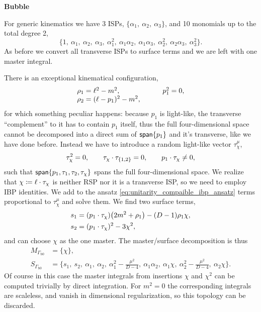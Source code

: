 \textbf{Bubble}

For generic kinematics we have 3 ISPs, $\{\alpha_1,~\alpha_2,~\alpha_3\}$, and
10 monomials up to the total degree 2,
\[
  \{1,~\alpha_1,~\alpha_2,~\alpha_3,~\alpha_1^2,~\alpha_1\alpha_2,~\alpha_1\alpha_3,~\alpha_2^2,~\alpha_2\alpha_3,~ \alpha_3^2\}.
\]
As before we convert all transverse ISPs to surface terms and we are left with one master integral.

There is an exceptional kinematical configuration,
\begin{equation*}
  \begin{tabular}{ll}
    $\rho_1 = \ell^2-m^2$,               &  \qquad $p_1^2=0$,\\
    $\rho_2 = (\ell-p_1)^2-m^2$,         &  \\
  \end{tabular}
\end{equation*}
for which something peculiar happens:
because $p_1$ is light-like, the transverse ``complement'' to it has to contain $p_1$ itself, thus the full four-dimensional space
cannot be decomposed into a direct sum of $\mathsf{span}\{p_1\}$ and it's transverse, like we have done before.
Instead we have to introduce a random light-like vector $\tau_\chi^\mu$,
\[
  \tau_\chi^2=0, \qquad \sp(\tau_\chi,\tau_{\{1,2\}}) = 0, \qquad  \sp(p_1,\tau_\chi) \neq 0,
\]
such that $\mathsf{span}\{p_1,\tau_1,\tau_2,\tau_\chi\}$ spans the full four-dimensional space.
We realize that $\chi \coloneqq \sp(\ell,\tau_\chi)$ is neither RSP nor it is a transverse ISP, so 
we need to employ IBP identities.
We add to the ansatz \eqref{eq:unitarity_compaible_ibp_ansatz} terms proportional to $\tau_\chi^\mu$ and solve them.
We find two surface terms,
\begin{align*}
  s_1 &= (\sp(p_1,\tau_\chi)) \qty(2 m^2 + \rho_1) - (D-1)\rho_1\chi, \\
  s_2 &= (\sp(p_1,\tau_\chi))^2 - 3 \chi^2,
\end{align*}
and can choose $\chi$ as the one master. The master/surface decomposition is thus
\begin{align*}
  M_{\Gamma_\text{b0} } &= \{\chi\}, \\
   S_{\Gamma_\text{b0} } &= 
  \{s_1,~s_2,~\alpha_1,~\alpha_2,~\alpha_1^2 - \frac{\mu^2}{D-4},~\alpha_1\alpha_2,~ \alpha_1\chi,~\alpha_2^2-\frac{\mu^2}{D-4},~\alpha_2\chi \}.
\end{align*}
Of course in this case the master integrals from insertions $\chi$ and $\chi^2$ can be computed trivially by direct integration.
For $m^2=0$ the corresponding integrals are scaleless, and vanish in dimensional regularization,
so this topology can be discarded.

